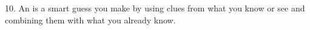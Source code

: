 \documentclass[12pt]{article}
\begin{document}
\vspace{3cm}

10. An \underline{\hspace{4cm}} is a smart guess you make by using clues from what you know or see and combining them with what you already know.





\end{document}
